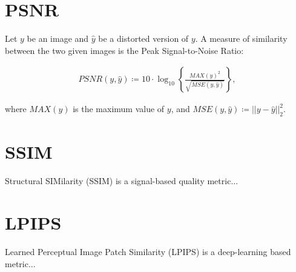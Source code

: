 \section{PSNR}
\label{sec:psnr}
Let $y$ be an image and $\hat{y}$ be a distorted version of $y$.
A measure of similarity between the two given images is the Peak Signal-to-Noise Ratio:

\begin{align}
    PSNR(y, \hat{y}) \coloneqq 10 \cdot \log_{10} \left\{ \frac{MAX(y)^2}{\sqrt{MSE(y, \hat{y})}} \right\},
\end{align}

where $MAX(y)$ is the maximum value of $y$, and $MSE(y, \hat{y}) \coloneqq || y - \hat{y} ||^2_2$.

\section{SSIM}
\label{sec:ssim}
Structural SIMilarity (SSIM) is a signal-based quality metric...

\section{LPIPS}
\label{sec:lpips}
Learned Perceptual Image Patch Similarity (LPIPS) is a deep-learning based metric...


